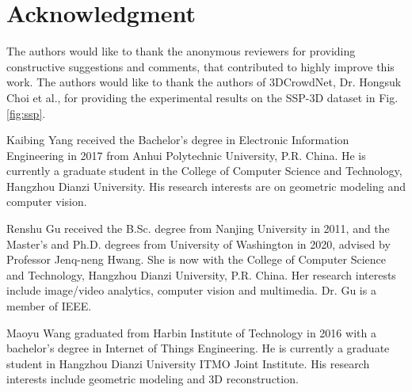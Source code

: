 \documentclass[journal]{IEEEtran}
\begin{document}
\section*{Acknowledgment}
 The authors would like to thank the anonymous reviewers for providing constructive suggestions and comments, that contributed to highly improve this work. The authors would like to thank the authors of 3DCrowdNet, Dr. Hongsuk Choi et al., for providing the experimental results on the SSP-3D dataset in Fig. \ref{fig:ssp}.























\begin{IEEEbiography}{Kaibing Yang} received the Bachelor's degree in Electronic Information Engineering in 2017 from Anhui Polytechnic University, P.R. China. He is currently a graduate student in the College of Computer Science and Technology, Hangzhou Dianzi University. His research interests are on geometric modeling and computer vision.
\end{IEEEbiography}

\begin{IEEEbiography}{Renshu Gu}
received the B.Sc. degree from Nanjing University in 2011, and the Master's and Ph.D. degrees from University of Washington in 2020, advised by Professor Jenq-neng Hwang. She is now with the College of Computer Science and Technology, Hangzhou Dianzi University, P.R. China. Her research interests include image/video analytics, computer vision and multimedia. Dr. Gu is a member of IEEE.
\end{IEEEbiography}


\begin{IEEEbiography}{Maoyu Wang} graduated from Harbin Institute of Technology in 2016 with a bachelor's degree in Internet of Things Engineering. He is currently a graduate student in Hangzhou Dianzi University ITMO Joint Institute. His research interests include geometric modeling and 3D reconstruction.
\end{IEEEbiography}
\end{document}
